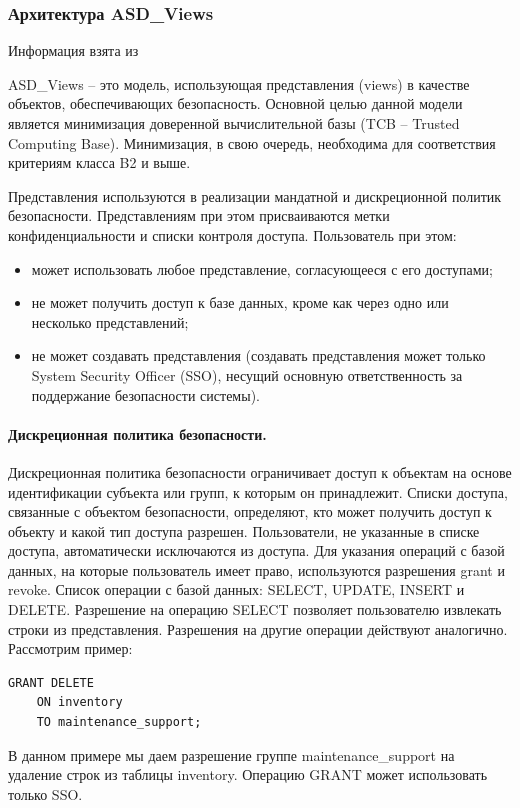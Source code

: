 \subsubsection{Архитектура ASD\_Views}

Информация взята из \autocite{ASDViews}

ASD\_Views –  это модель, использующая представления (views) в качестве объектов, обеспечивающих безопасность. 
Основной целью данной модели является минимизация доверенной вычислительной базы (TCB – Trusted Computing Base). 
Минимизация, в свою очередь, необходима для соответствия критериям класса B2 и выше.

Представления используются в реализации мандатной и дискреционной политик безопасности. 
Представлениям при этом присваиваются метки конфиденциальности и списки контроля доступа. Пользователь при этом:
\begin{itemize}
    \item может использовать любое представление, согласующееся с его доступами;
    \item не может получить доступ к базе данных, кроме как через одно или несколько представлений;
    \item не может создавать представления (создавать представления может только System Security Officer (SSO), 
    несущий основную ответственность за поддержание безопасности системы).
\end{itemize}

\paragraph{Дискреционная политика безопасности.}

Дискреционная политика безопасности ограничивает доступ к объектам на основе идентификации субъекта или групп, 
к которым он принадлежит. Списки доступа, связанные с объектом безопасности, определяют, 
кто может получить доступ к объекту и какой тип доступа разрешен. Пользователи, не указанные в списке доступа, 
автоматически исключаются из доступа. Для указания операций с базой данных, на которые пользователь имеет право, 
используются разрешения grant и revoke. Список операции с базой данных: SELECT, UPDATE, INSERT и DELETE. 
Разрешение на операцию SELECT позволяет пользователю извлекать строки из представления. 
Разрешения на другие операции действуют аналогично. Рассмотрим пример:
\begin{lstlisting}[]
    GRANT DELETE
    ON inventory
    TO maintenance_support;
\end{lstlisting}
В данном примере мы даем разрешение группе maintenance\_support на удаление строк из таблицы inventory. 
Операцию GRANT может использовать только SSO.

